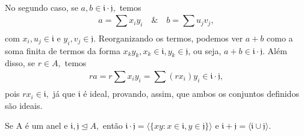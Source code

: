 \documentclass[AlgebraII/algebraII_notes.tex]{subfiles}
\begin{document}
No segundo caso, se \(a, b\in \mathfrak{i}\cdot \mathfrak{j},\) temos
\[
	a = \sum\limits_{}^{}x_{i}y_{i}\quad\&\quad b = \sum\limits_{}^{}u_{j}v_{j},
\]
com \(x_{i}, u_{j}\in \mathfrak{i}\) e \(y_{i}, v_{j}\in \mathfrak{j}.\) Reorganizando os termos, podemos ver
\(a+b\) como a soma finita de termos da forma \(x_{k}y_{k}, x_{k}\in \mathfrak{i}, y_{k}\in \mathfrak{j}\), ou seja,
\(a+b\in \mathfrak{i}\cdot \mathfrak{j}\). Além disso, se \(r\in A,\) temos
\[
	ra = r \sum\limits_{}^{}x_{i}y_{i} = \sum\limits_{}^{}(rx_{i})y_{i}\in \mathfrak{i}\cdot \mathfrak{j},
\]
pois \(rx_{i}\in \mathfrak{i},\) já que \(\mathfrak{i}\) é ideal, provando, assim, que ambos os conjuntos definidos são ideais.
\begin{lemma*}
	Se A é um anel e \(\mathfrak{i}, \mathfrak{j}\trianglelefteq{A},\) então \(\mathfrak{i}\cdot \mathfrak{j}=\langle \{xy: x\in \mathfrak{i}, y\in \mathfrak{j}\} \rangle\) e
	\(\mathfrak{i}+\mathfrak{j} = \langle \mathfrak{i}\cup \mathfrak{j} \rangle\).
\end{lemma*}
\end{document}
